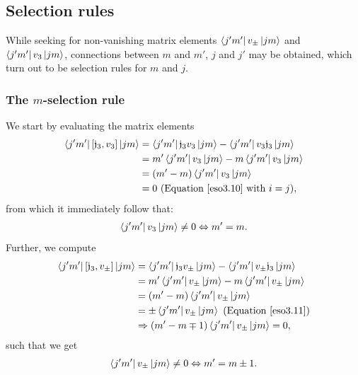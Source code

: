 \documentclass[12pt,a4paper]{report}
\theoremstyle{definition}
\theoremstyle{remark}
\theoremstyle{remark}
\begin{document}
\subsection{Selection rules}
While seeking for non-vanishing matrix elements $\bra{j'm'}v_\pm\ket{jm}$ and $\bra{j'm'}v_3\ket{jm}$, connections between $m$ and $m'$, $j$ and $j'$ may be obtained, which turn out to be selection rules for $m$ and $j$.
\subsubsection{The $m$-selection rule}
We start by evaluating the matrix elements
\begin{align*}
\bra{j'm'}[\mathfrak{j}_3,v_3]\ket{jm}&=\bra{j'm'}\mathfrak{j}_3v_3\ket{jm}-\bra{j'm'}v_3\mathfrak{j}_3\ket{jm}\\
&=m'\bra{j'm'}v_3\ket{jm}-m\bra{j'm'}v_3\ket{jm}\\
&=(m'-m)\bra{j'm'}v_3\ket{jm}\\
&=0 \text{ (Equation~\ref{eso3.10} with }i=j),
\end{align*}
from which it immediately follow that:
\begin{equation}\label{eso3.16}
\begin{aligned}
\bra{j'm'}v_3\ket{jm}\neq 0 \Leftrightarrow m'=m.
\end{aligned}
\end{equation}
Further, we compute
\begin{align*}
\bra{j'm'}[\mathfrak{j}_3,v_\pm]\ket{jm}&=\bra{j'm'}\mathfrak{j}_3v_\pm\ket{jm}-\bra{j'm'}v_\pm\mathfrak{j}_3\ket{jm}\\
&=m'\bra{j'm'}v_\pm\ket{jm}-m\bra{j'm'}v_\pm\ket{jm}\\
&=(m'-m)\bra{j'm'}v_\pm\ket{jm}\\
&=\pm \bra{j'm'}v_\pm\ket{jm} \text{ (Equation~\ref{eso3.11})}\\
&\Rightarrow (m'-m\mp 1)\bra{j'm'}v_\pm\ket{jm}=0,
\end{align*}
such that we get
\begin{equation}\label{eso3.14}
\begin{aligned}
\bra{j'm'}v_\pm\ket{jm}\neq 0 \Leftrightarrow m'=m\pm 1.
\end{aligned}
\end{equation}
\end{document}
